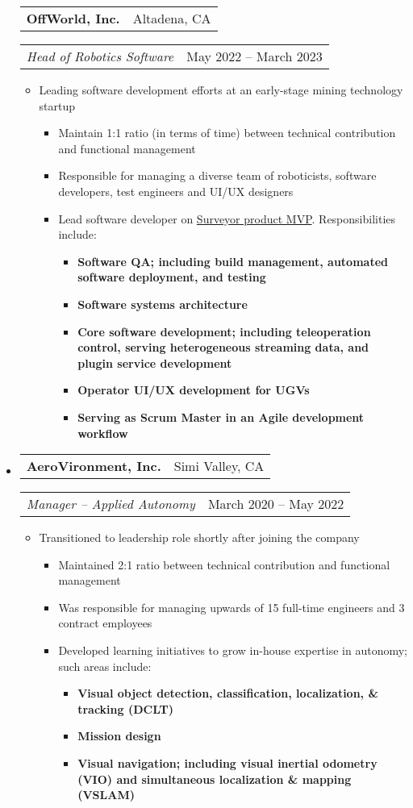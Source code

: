 \documentclass[letterpaper,18pt]{article}
\makeatletter
\newcommand{\resitem}[1]{\item #1 \vspace{-2pt}}
\newcommand{\headerrow}[2]{%
  \hspace*{-\labelsep}%
  \begin{tabular*}{\dimexpr\linewidth+\labelsep}{@{\extracolsep{\fill}}lr@{}}
    #1 &
    #2 \\
  \end{tabular*}%
}
\makeatother
\begin{document}
\begin{itemize}[label={},leftmargin=*,noitemsep]
	\headerrow{\textbf{OffWorld, Inc.}}{Altadena, CA}
    \headerrow{\emph{Head of Robotics Software}}{May 2022 -- March 2023}
	{\small
	\begin{itemize}[noitemsep]
        \resitem{Leading software development efforts at an early-stage mining technology startup}
        \begin{itemize}[noitemsep]
                \resitem{Maintain 1:1 ratio (in terms of time) between technical contribution and functional management}
                \resitem{Responsible for managing a diverse team of roboticists, software developers, test engineers and UI/UX designers}
                \resitem{Lead software developer on \href{https://www.offworld.ai/surveyor}{Surveyor product MVP}.  Responsibilities include:}
                \begin{itemize}[noitemsep]
                    \resitem{\textbf{Software QA; including build management, automated software deployment, and testing}}
                    \resitem{\textbf{Software systems architecture}}
                    \resitem{\textbf{Core software development; including teleoperation control, serving heterogeneous streaming data, and plugin service development}}
                    \resitem{\textbf{Operator UI/UX development for UGVs}}
                    \resitem{\textbf{Serving as Scrum Master in an Agile development workflow}}
                \end{itemize}
        \end{itemize}
	\end{itemize}
	}
\newpage
\item
	\headerrow{\textbf{AeroVironment, Inc.}}{Simi Valley, CA}
    \headerrow{\emph{Manager -- Applied Autonomy}}{March 2020 -- May 2022}
	{\small
	\begin{itemize}[noitemsep]
        \resitem{Transitioned to leadership role shortly after joining the company}
        \begin{itemize}[noitemsep]
                \resitem{Maintained 2:1 ratio between technical contribution and functional management}
                \resitem{Was responsible for managing upwards of 15 full-time engineers and 3 contract employees}
                \resitem{Developed learning initiatives to grow in-house expertise in autonomy; such areas include:}
                \begin{itemize}[noitemsep]
                    \resitem{\textbf{Visual object detection, classification, localization, \& tracking (DCLT)}}
                    \resitem{\textbf{Mission design}}
                    \resitem{\textbf{Visual navigation; including visual inertial odometry (VIO) and simultaneous localization \& mapping (VSLAM)}}

\end{itemize}
\end{itemize}
\end{itemize}}
\end{itemize}
\end{document}
